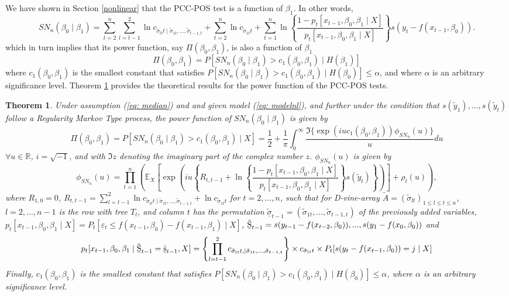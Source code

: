 \documentclass[harvard,11pt]{article}
\newcommand{\E}{\mathbb{E}}
\newtheorem{theorem}{Theorem}
\begin{document}
We have shown in Section \ref{nonlinear} that the PCC-POS test is a function of $\beta_1$. In other words,
\[
SN_{n}(\beta_0\mid\beta _{1})=\sum\limits_{t=2}^{n}\sum\limits_{l=t-1}^{2}\ln c_{\tilde{\sigma}_{lt}t\mid \tilde{\sigma}_{1t},...,\tilde{\sigma}_{t-1,t}}+\sum\limits_{t=2}^{n}\ln c_{\tilde{\sigma}_{1t}t}+\sum\limits_{t=1}^{n}\ln\left\{\frac{1-p_t[x_{t-1},\beta_0,\beta_1\mid X]}{p_t[x_{t-1},\beta_0,\beta_1\mid X]}\right\}s(y_t-f(x_{t-1},\beta_0)).
\]
which in turn implies that its power function, say $\Pi(\beta_0,\beta_1)$, is also a function of $\beta_1$
\[
\Pi(\beta_0,\beta_1)=P[SN_{n}(\beta_0\mid\beta _{1})>c_1(\beta_0,\beta_1)\mid H(\beta_1)]
\]
where $c_1(\beta_0,\beta_1)$ is the smallest constant that satisfies $P[SN_n(\beta_0\mid\beta_1)>c_1(\beta_0,\beta_1)\mid H(\beta_0)]\leq \alpha$, and where $\alpha$ is an arbitrary significance level.  Theorem \ref{Theorem1} provides the theoretical results for the power function of the PCC-POS tests.
\begin{theorem}\label{Theorem1} 
Under assumption (\ref{eq: median}) and and given model (\ref{eq: modelnl}), and further under the condition that $s(\tilde{y}_1),...,s(\tilde{y}_t)$ follow a Regularity Markov Type process, the power function of $SN_{n}(\beta_0\mid\beta _{1})$ is given by
\[
\Pi(\beta_0,\beta_1)=P[SN_n(\beta_0\mid \beta_1)> c_1(\beta_0,\beta_1)\mid X]=\frac{1}{2}+\frac{1}{\pi}\int_{0}^{\infty}\frac{\Im\{\exp(iuc_1(\beta_0,\beta_1))\phi_{SN_n}(u)\}}{u}du
\] 
$\forall u \in \mathbb{R}$, $i=\sqrt{-1}$, and with $\Im{z}$ denoting the imaginary part of the complex number $z$. $\phi_{SN_n}(u)$ is given by
\[
\phi_{SN_n}(u)=\prod\limits_{t=1}^{n}\left(\E_X\left[\exp\left(iu\left\{R_{t,t-1}+\ln\left\{\frac{1-p_t[x_{t-1},\beta_0,\beta_1\mid X]}{p_t[x_{t-1},\beta_0,\beta_1\mid X]}\right\}s(\tilde{y}_t)\right\}\right)\right]+\rho_t(u)\right),
\]
where $R_{1,0}=0$, $R_{t,t-1}=\sum\limits_{l=t-1}^{2}\ln c_{\tilde{\sigma}_{lt}t\mid \tilde{\sigma}_{1t},...,\tilde{\sigma}_{t-1,t}}+\ln c_{\tilde{\sigma}_{1t}t}$ for $t=2,...,n$, such that for D-vine-array $\tilde{A}=(\tilde{\sigma}_{lt})_{1\leq l\leq t\leq n}$, $l=2,...,n-1$ is the row with tree $T_l$, and column $t$ has the permutation $\tilde{\underline{\sigma}}_{t-1}=(\tilde{\sigma}_{1t},...,\tilde{\sigma}_{t-1,t})$ of the previously added variables, $p_t[x_{t-1},\beta_0,\beta_1\mid X]=P_t[\varepsilon_t\leq f(x_{t-1},\beta_0)-f(x_{t-1},\beta_1)\mid X]$, $\tilde{\text{\b{S}}}_{t-1}=s(y_{t-1}-f(x_{t-2},\beta_0)),...,s(y_{1}-f(x_{0},\beta_0))$ and 
\[
p_t[x_{t-1},\beta_0,\beta_1\mid \tilde{\text{\b{S}}}_{t-1}=\tilde{\text{\b{s}}}_{t-1},X]=\left\{\prod\limits_{l=t-1}^{2} c_{\tilde{\sigma}_{lt}t,\mid \tilde{\sigma}_{1t},...,\tilde{\sigma}_{t-1,t}}\right\}\times c_{\tilde{\sigma}_{lt}t}\times P_t[s(y_t-f(x_{t-1},\beta_0))=j\mid X]
\]
Finally, $c_1(\beta_0,\beta_1)$ is the smallest constant that satisfies $P[SN_n(\beta_0\mid\beta_1)>c_1(\beta_0,\beta_1)\mid H(\beta_0)]\leq \alpha$, where $\alpha$ is an arbitrary significance level. 
\end{theorem}
\end{document}
